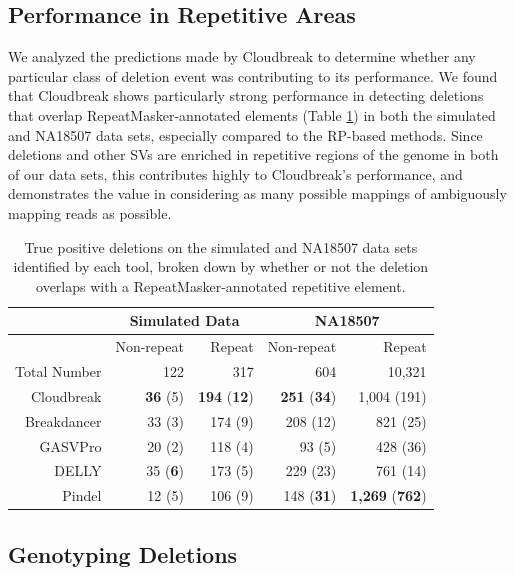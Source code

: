\documentclass[11pt]{article}
\begin{document}
\subsection{Performance in Repetitive Areas}

We analyzed the predictions made by Cloudbreak to determine whether any particular class of deletion event was contributing to its performance. We found that Cloudbreak shows particularly strong performance in detecting deletions that overlap RepeatMasker-annotated elements (Table \ref{repmaskpreds}) in both the simulated and NA18507 data sets, especially compared to the RP-based methods. Since deletions and other SVs are enriched in repetitive regions of the genome in both of our data sets, this contributes highly to Cloudbreak's performance, and demonstrates the value in considering as many possible mappings of ambiguously mapping reads as possible.

\begin{table}
\begin{center}
\begin{tabular}{rrr|rr}
 & \multicolumn{2}{c}{Simulated Data} & \multicolumn{2}{c}{NA18507} \\
\hline
 &  Non-repeat & Repeat  &  Non-repeat & Repeat \\ 
 Total Number & 122 & 317 & 604 & 10,321 \\ 
  \hline
Cloudbreak & \textbf{36} (5) & \textbf{194} (\textbf{12}) & \textbf{251} (\textbf{34}) & 1,004 (191) \\ 
  Breakdancer &  33 (3) & 174 (9) & 208 (12) & 821 (25) \\ 
  GASVPro & 20 (2) & 118 (4) & 93 (5) & 428 (36) \\ 
  DELLY & 35 (\textbf{6}) & 173 (5) & 229 (23) & 761 (14) \\ 
  Pindel & 12 (5) & 106 (9) & 148 (\textbf{31}) & \textbf{1,269} (\textbf{762}) \\ 
   \hline
\end{tabular}
\end{center}
\caption{True positive deletions on the simulated and NA18507 data sets identified by each tool, broken down by whether or not the deletion overlaps with a RepeatMasker-annotated repetitive element.}
\label{repmaskpreds}
\end{table}

\subsection{Genotyping Deletions}
\end{document}

